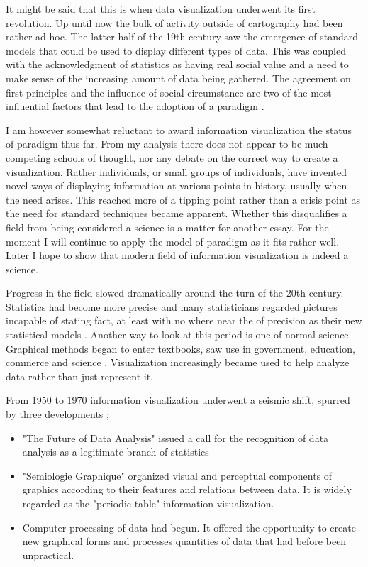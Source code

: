 \documentclass[a4paper, 10pt, titlepage]{article}
\begin{document}
It might be said that this is when data visualization underwent its first revolution. Up until now the bulk of activity outside of cartography had been rather ad-hoc. The latter half of the 19th century saw the emergence of standard models that could be used to display different types of data. This was coupled with the acknowledgment of statistics as having real social value and a need to make sense of the increasing amount of data being gathered. The agreement on first principles and the influence of social circumstance are two of the most influential factors that lead to the adoption of a paradigm \cite{kuhn1996structure}.

I am however somewhat reluctant to award information visualization the status of paradigm thus far. From my analysis there does not appear to be much competing schools of thought, nor any debate on the correct way to create a visualization. Rather individuals, or small groups of individuals, have invented novel ways of displaying information at various points in history, usually when the need arises. This reached more of a tipping point rather than a crisis point as the need for standard techniques became apparent. Whether this disqualifies a field from being considered a science is a matter for another essay. For the moment I will continue to apply the model of paradigm as it fits rather well. Later I hope to show that modern field of information visualization is indeed a science. 

Progress in the field slowed dramatically around the turn of the 20th century. Statistics had become more precise and many statisticians regarded pictures incapable of stating fact, at least with no where near the of precision as their new statistical models \cite{friendly2000discussion}. Another way to look at this period is one of normal science. Graphical methods began to enter textbooks, saw use in government, education, commerce and science \cite{haskell1919make} \cite{ayres1919war} \cite{gantt1919organization}. Visualization increasingly became used to help analyze data rather than just represent it.

From 1950 to 1970 information visualization underwent a seismic shift, spurred by three developments \cite{friendly2001milestones};
\begin{itemize}
\item "The Future of Data Analysis" issued a call for the recognition of data analysis as a legitimate branch of statistics \cite{tukey1962future}
\item "Semiologie Graphique" \cite{bertin1973semiologie} organized visual and perceptual components of graphics according to their features and relations between data. It is widely regarded as the "periodic table" information visualization.
\item Computer processing of data had begun. It offered the opportunity to create new graphical forms and processes quantities of data that had before been unpractical.
\end{itemize}
\end{document}
